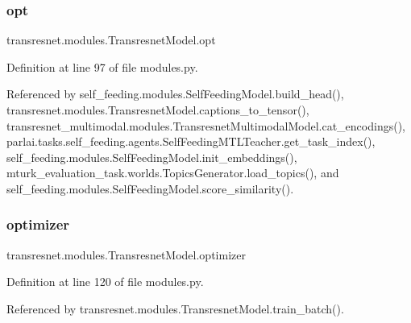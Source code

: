\subsubsection{\texorpdfstring{opt}{opt}}
{\footnotesize\ttfamily transresnet.\+modules.\+Transresnet\+Model.\+opt}



Definition at line 97 of file modules.\+py.



Referenced by self\+\_\+feeding.\+modules.\+Self\+Feeding\+Model.\+build\+\_\+head(), transresnet.\+modules.\+Transresnet\+Model.\+captions\+\_\+to\+\_\+tensor(), transresnet\+\_\+multimodal.\+modules.\+Transresnet\+Multimodal\+Model.\+cat\+\_\+encodings(), parlai.\+tasks.\+self\+\_\+feeding.\+agents.\+Self\+Feeding\+M\+T\+L\+Teacher.\+get\+\_\+task\+\_\+index(), self\+\_\+feeding.\+modules.\+Self\+Feeding\+Model.\+init\+\_\+embeddings(), mturk\+\_\+evaluation\+\_\+task.\+worlds.\+Topics\+Generator.\+load\+\_\+topics(), and self\+\_\+feeding.\+modules.\+Self\+Feeding\+Model.\+score\+\_\+similarity().

\mbox{\label{classtransresnet_1_1modules_1_1TransresnetModel_a6094f5e2576bb4b018f06afdb0a5ab25}} 
\subsubsection{\texorpdfstring{optimizer}{optimizer}}
{\footnotesize\ttfamily transresnet.\+modules.\+Transresnet\+Model.\+optimizer}



Definition at line 120 of file modules.\+py.



Referenced by transresnet.\+modules.\+Transresnet\+Model.\+train\+\_\+batch().

\mbox{\label{classtransresnet_1_1modules_1_1TransresnetModel_a39b68fff51a01dd00581b553ee37eb50}} 
